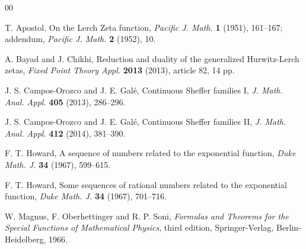 \documentclass[11pt,a4paper]{amsart}
\theoremstyle{plain}
\theoremstyle{plain}
\theoremstyle{definition}
\theoremstyle{remark}
\begin{document}
\begin{thebibliography}{00}

T. Apostol, 
{On the Lerch Zeta function},
\textit{Pacific J. Math.} \textbf{1} (1951), 161--167;
addendum, \textit{Pacific J. Math.} \textbf{2} (1952), 10.


A. Bayad and J. Chikhi,
Reduction and duality of the generalized Hurwitz-Lerch zetas,
\textit{Fixed Point Theory Appl.} 
\textbf{2013} (2013), article 82, 14 pp.


J. S. Campos-Orozco and J. E. Gal\'e,
Continuous Sheffer families I,
\textit{J. Math. Anal. Appl.} 
\textbf{405} (2013), 286--296.

J. S. Campos-Orozco and J. E. Gal\'e,
Continuous Sheffer families II,
\textit{J. Math. Anal. Appl.} 
\textbf{412} (2014), 381--390.

F. T. Howard, 
A sequence of numbers related to the exponential function, 
\textit{Duke Math. J.} 
\textbf{34} (1967), 599--615.

F. T. Howard, 
Some sequences of rational numbers related to the exponential function, 
\textit{Duke Math. J.} 
\textbf{34} (1967), 701--716.


W. Magnus, F. Oberhettinger and R. P. Soni,
\textit{Formulas and Theorems for the Special Functions of Mathematical Physics},
third edition, Springer-Verlag, Berlin-Heidelberg, 1966.


\end{thebibliography}
\end{document}
